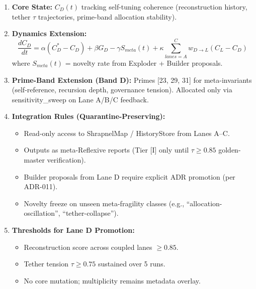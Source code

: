 \documentclass[11pt]{article}
\begin{document}
\begin{enumerate}
    \item \textbf{Core State:} $C_D(t)$ tracking self-tuning coherence (reconstruction history, tether $\tau$ trajectories, prime-band allocation stability).
    \item \textbf{Dynamics Extension:}
    \[
    \frac{dC_D}{dt} = \alpha(C_D^* - C_D) + \beta G_D - \gamma S_{meta}(t) + \kappa \sum_{lanes=A}^{C} w_{D \to L}(C_L - C_D)
    \]
    where $S_{meta}(t)$ = novelty rate from Exploder + Builder proposals.
    \item \textbf{Prime-Band Extension (Band D):} Primes [23, 29, 31] for meta-invariants (self-reference, recursion depth, governance tension). Allocated only via sensitivity_sweep on Lane A/B/C feedback.
    \item \textbf{Integration Rules (Quarantine-Preserving):}
    \begin{itemize}
        \item Read-only access to ShrapnelMap / HistoryStore from Lanes A–C.
        \item Outputs as meta-Reflexive reports (Tier [I] only until $\tau \geq 0.85$ golden-master verification).
        \item Builder proposals from Lane D require explicit ADR promotion (per ADR-011).
        \item Novelty freeze on unseen meta-fragility classes (e.g., ``allocation-oscillation'', ``tether-collapse'').
    \end{itemize}
    \item \textbf{Thresholds for Lane D Promotion:}
    \begin{itemize}
        \item Reconstruction score across coupled lanes $\geq 0.85$.
        \item Tether tension $\tau \geq 0.75$ sustained over 5 runs.
        \item No core mutation; multiplicity remains metadata overlay.
    \end{itemize}
\end{enumerate}
\end{document}
